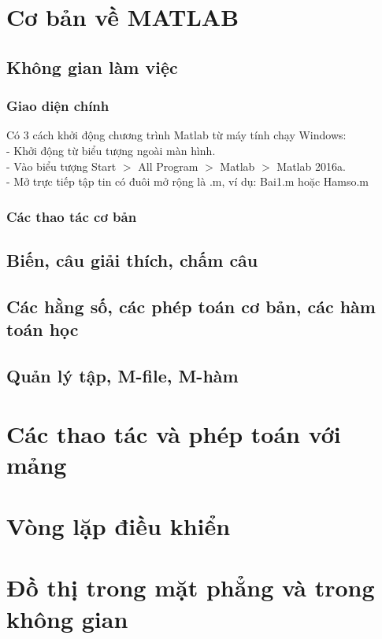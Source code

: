 \documentclass[12pt,a4paper]{article}
\begin{document}
\renewcommand\thesection{\Roman{section}.}
\renewcommand\thesubsection{\arabic{subsection}.}
\renewcommand\thesubsubsection{\alph{subsubsection}.}
\tableofcontents

\section{Cơ bản về MATLAB}
\subsection{Không gian làm việc}
\subsubsection{Giao diện chính}
Có 3 cách khởi động chương trình Matlab từ máy tính chạy Windows:\\
- Khởi động từ biểu tượng ngoài màn hình.\\
- Vào biểu tượng Start $>$ All Program $>$ Matlab $>$ Matlab 2016a.\\
- Mở trực tiếp tập tin có đuôi mở rộng là .m, ví dụ: Bai1.m hoặc Hamso.m\\


\subsubsection{Các thao tác cơ bản}

\subsection{Biến, câu giải thích, chấm câu}
\subsection{Các hằng số, các phép toán cơ bản, các hàm toán học}
\subsection{Quản lý tập, M-file, M-hàm}
\section{Các thao tác và phép toán với mảng}
\section{Vòng lặp điều khiển}
\section{Đồ thị trong mặt phẳng và trong không gian}
	
\end{document}

